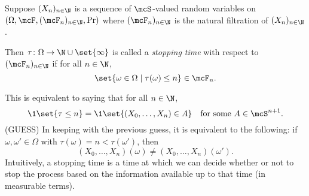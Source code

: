 \begin{definition*} \label{def:stopping_time}
    Suppose $(X_n)_{n \in \N}$ is a sequence of $\mcS$-valued random variables
    on $(\Omega, \F, (\F_n)_{n \in \N}, \Pr)$ where $(\F_n)_{n \in \N}$ is
    the natural filtration of $(X_n)_{n \in \N}$.

    Then $\tau\colon \Omega \to \N \cup \set{\infty}$ is called a
    \emph{stopping time} with respect to $(\F_n)_{n \in \N}$ if for all
    $n \in \N$, \[
        \set{\omega \in \Omega \mid \tau(\omega) \le n} \in \F_n.
    \]
\end{definition*}
This is equivalent to saying that for all $n \in \N$, \[
    \1{\set{\tau \le n}} = \1{\set{(X_0, \dots, X_n) \in A}}
    \quad \text{for some } A \in \mcS^{n+1}.
\]
(GUESS) In keeping with the previous guess, it is equivalent to the
following: if $\omega, \omega' \in \Omega$ with
$\tau(\omega) = n < \tau(\omega')$, then \[
    (X_0, \dots, X_n)(\omega) \ne (X_0, \dots, X_n)(\omega').
\]
Intuitively, a stopping time is a time at which we can decide whether or not
to stop the process based on the information available up to that time (in
measurable terms).

